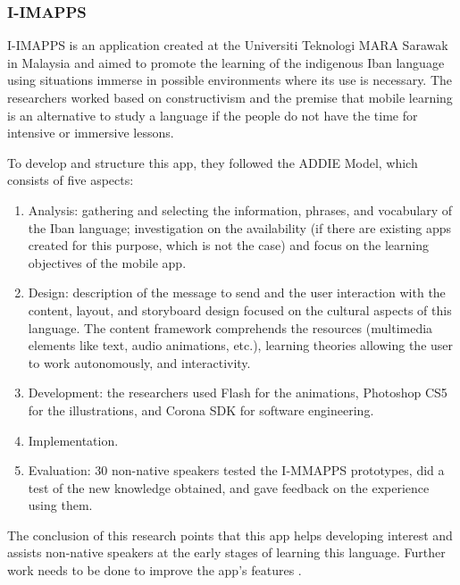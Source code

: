 \subsubsection{I-IMAPPS}

I-IMAPPS is an application created at the Universiti Teknologi MARA Sarawak in Malaysia and aimed to promote the learning of the indigenous Iban language using situations immerse in possible environments where its use is necessary. The researchers worked based on constructivism and the premise that mobile learning is an alternative to study a language if the people do not have the time for intensive or immersive lessons. 


To develop and structure this app, they followed the ADDIE Model, which consists of five aspects: 

\begin{enumerate}
    \item Analysis: gathering and selecting the information, phrases, and vocabulary of the Iban language; investigation on the availability (if there are existing apps created for this purpose, which is not the case) and focus on the learning objectives of the mobile app.
    \item Design: description of the message to send and the user interaction with the content, layout, and storyboard design focused on the cultural aspects of this language. The content framework comprehends the resources (multimedia elements like text, audio animations, etc.), learning theories allowing the user to work autonomously, and interactivity.
    
    \item Development: the researchers used Flash for the animations, Photoshop CS5  for the illustrations, and Corona SDK for software engineering. 

    
    \item Implementation.
    
    \item Evaluation: 30 non-native speakers tested the I-MMAPPS prototypes, did a test of the new knowledge obtained, and gave feedback on the experience using them.
    
\end{enumerate}

The conclusion of this research points that this app helps developing interest and assists non-native speakers at the early stages of learning this language. Further work needs to be done to improve the app's features \cite{CHACHIL2015267}. 



